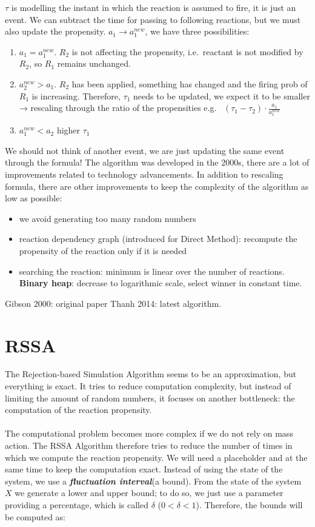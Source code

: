 \noindent
$\tau$ is modelling the instant in which the reaction is assumed to fire, it is just an event.
We can subtract the time for passing to following reactions, but we must also update the propensity.
$a_1 \rightarrow a_1^{new}$, we have three possibilities:

\begin{enumerate}
  \def\labelenumi{\arabic{enumi}.}
  \item $a_1 = a_1^{new}$. $R_2$ is not affecting the propensity, i.e.~reactant is not modified by $R_2$, so $R_1$ remains unchanged.
  \item $a_2^{new}> a_1$. $R_2$ has been applied, something has changed and the firing prob of $R_1$ is increasing.
    Therefore, $\tau_1$ needs to be updated, we expect it to be smaller → rescaling through the ratio of the propensities e.g. ~$(\tau_1-\tau_2) \cdot \frac{a_1}{a_1^{new}}$ \item $a_1^{new}< a_2$ higher $\tau_1$
\end{enumerate}
\noindent
We should not think of another event, we are just updating the same event through the formula! The algorithm was developed in the 2000s, there are a lot of improvements related to technology advancements.
In addition to rescaling formula, there are other improvements to keep the complexity of the algorithm as low as possible:

\begin{itemize}
  \item we avoid generating too many random numbers
  \item reaction dependency graph (introduced for Direct Method): recompute the propensity of the reaction only if it is needed
  \item searching the reaction: minimum is linear over the number of reactions.
    \textbf{Binary heap}: decrease to logarithmic scale, select winner in constant time.
\end{itemize}
\noindent
Gibson 2000: original paper Thanh 2014: latest algorithm.

\section{RSSA}
The Rejection-based Simulation Algorithm seems to be an approximation, but everything is exact.
It tries to reduce computation complexity, but instead of limiting the amount of random numbers, it focuses on another bottleneck: the computation of the reaction propensity.
\\
\\
\noindent
The computational problem becomes more complex if we do not rely on mass action.
The RSSA Algorithm therefore tries to reduce the number of times in which we compute the reaction propensity.
We will need a placeholder and at the same time to keep the computation exact.
Instead of using the state of the system, we use a \textbf{\emph{fluctuation interval}}(a bound).
From the state of the system $X$ we generate a lower and upper bound; to do so, we just use a parameter providing a percentage, which is called $\delta$ ($0<\delta<1$).
Therefore, the bounds will be computed as:

